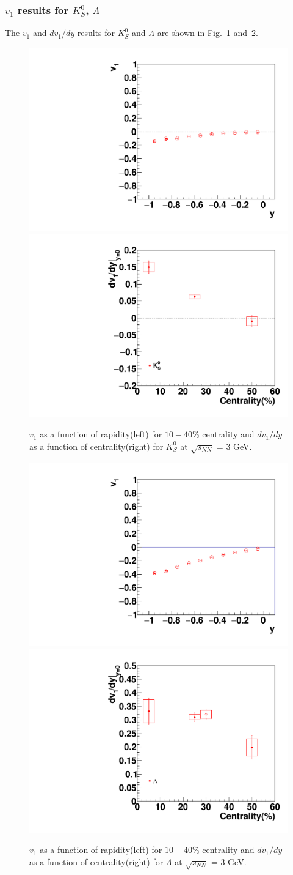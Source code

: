 \subsubsection{$v_1$ results for $K^0_S$, $\Lambda$}

The $v_1$ and $dv_{1}/dy$ results for $K^0_S$ and $\Lambda$ are shown in 
Fig.~\ref{ks_dv1dy} and~\ref{lambda_dv1dy}. 

\begin{figure}[h]
\includegraphics[width=0.49\linewidth]{chapterX/fig/ks_sys_v1.pdf}
\includegraphics[width=0.49\linewidth]{chapterX/fig/ks_sys_vn.pdf}
\caption{$v_1$ as a function of rapidity(left) for $10-40\%$ centrality and  $dv_{1}/dy$ as a function of centrality(right) for $K^{0}_{S}$ at $\sqrt{s_{NN}}$ = 3 GeV.}
\label{ks_dv1dy}
\end{figure}

\begin{figure}[h]
\includegraphics[width=0.49\linewidth]{chapterX/fig/ld_sys_v1.pdf}
\includegraphics[width=0.49\linewidth]{chapterX/fig/ld_sys_vn.pdf}
\caption{$v_1$ as a function of rapidity(left) for $10-40\%$ centrality and  $dv_{1}/dy$ as a function of centrality(right) for $\Lambda$ at $\sqrt{s_{NN}}$ = 3 GeV.}
\label{lambda_dv1dy}
\end{figure}



